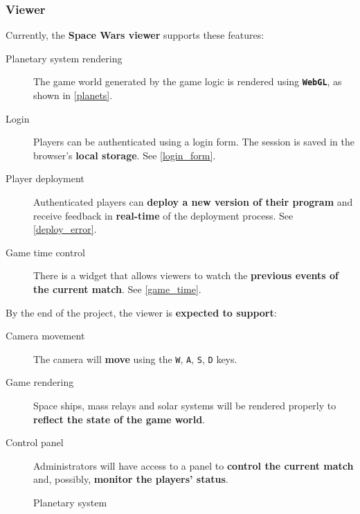 \documentclass[a4paper,11pt]{article}
\begin{document}
\subsubsection{Viewer}
Currently, the \textbf{Space Wars viewer} supports these features:
\begin{description}
\item[Planetary system rendering]
The game world generated by the game logic is rendered using \textbf{\texttt{WebGL}},
  as shown in \autoref{planets}.
\item[Login]
Players can be authenticated using a login form. The session is saved in the browser's
  \textbf{local storage}.
  See \autoref{login_form}.
\item[Player deployment]
Authenticated players can \textbf{deploy a new version of their program} and receive feedback
  in \textbf{real-time} of the deployment process. See \autoref{deploy_error}.
\item[Game time control]
There is a widget that allows viewers to watch the \textbf{previous events of the
  current match}. See \autoref{game_time}.
\end{description}
\indent
By the end of the project, the viewer is \textbf{expected to support}:
\begin{description}
\item[Camera movement]
The camera will \textbf{move} using the \texttt{W}, \texttt{A}, \texttt{S}, \texttt{D} keys.
\item[Game rendering]
Space ships, mass relays and solar systems will be rendered properly to \textbf{reflect the
  state of the game world}.
\item[Control panel]
Administrators will have access to a panel to \textbf{control the current match} and, possibly,
  \textbf{monitor the players' status}.
\end{description}
\begin{figure}[H]
\noindent{}
\caption{Planetary system}
\label{planets}
\end{figure}
\end{document}
